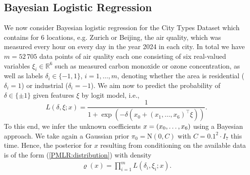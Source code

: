 \documentclass[sn-mathphys-num]{sn-jnl}%
\theoremstyle{thmstyleone}%
\theoremstyle{thmstyletwo}%
\theoremstyle{thmstylethree}%
\newcommand{\rhoapp}{\varrho_{{\rm app}}}
\newcommand{\change}[1]{\bgroup\color{black}#1\egroup}    %
\begin{document}





\subsection{Bayesian Logistic Regression}\label{sec:BLR}

We now consider Bayesian logistic regression for the City Types Dataset \cite{Elebiary} which contains for $6$ locations, e.g. Zurich or Beijing, the air quality, which was measured every hour on every day in the year 2024 in each city. In total we have $m= 52 \, 705$ data points of air quality each one consisting of six real-valued variables $\xi_i\in\mathbb{R}^{6}$ such as measured carbon monoxide or ozone concentration, as well as labels $\delta_i\in\{-1,1\}$, $i=1, \dots, m$, denoting whether the area is residential ($\delta_i = 1$) or industrial ($\delta_i=-1$).        
We aim now to predict the probability of $\delta \in \{\pm 1\}$ given features $\xi$ by logit model, i.e.,
\[
L(\delta, \xi; x)
=
\frac{1}{1+ \exp(-\delta (x_0 + (x_1,\ldots,x_{6})^\top \xi ))}.
\]
To this end, we infer the unknown coefficients $x = (x_0, \ldots, x_{\change{6}})$ using a Bayesian approach. We take again a Gaussian prior $\pi_0=\mathrm{N}(0,C)$ with $C=0.1^2\cdot I_{7}$ this time.
Hence, the posterior for $x$ resulting from conditioning on the available data is of the form (\ref{PMLR:distribution}) with density 
\begin{align}\label{logreg:density}
	\varrho(x)
	=
	\prod_{i=1}^{m} L(\delta_i, \xi_i; x).
\end{align}
\end{document}
